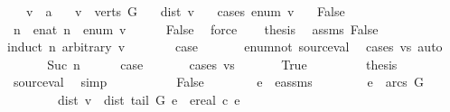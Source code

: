 \begin{isabellebody}
\ \ \ v\ {\isacharcolon}{\isacharcolon}\ {\isacharprime}a\isanewline
\ \ \ {\isachardoublequoteopen}v\ {\isasymin}\ verts\ G{\isachardoublequoteclose}\isanewline
\ \ \ {\isachardoublequoteopen}dist\ v\ {\isasymnoteq}\ {\isacharminus}{\isasyminfinity}{\isachardoublequoteclose}\isanewline
%
\isadelimproof
%
\endisadelimproof
%
\isatagproof
{}\isamarkupfalse%
\ {\isacharparenleft}cases\ {\isachardoublequoteopen}enum\ v\ {\isacharequal}\ {\isasyminfinity}{\isachardoublequoteclose}{\isacharparenright}\isanewline
{}\isamarkupfalse%
\ False\ \isanewline
\ \ \isamarkupfalse%
\ n\ \ {\isachardoublequoteopen}enat\ n\ {\isacharequal}\ enum\ v{\isachardoublequoteclose}\isanewline
\ \ \ \ \isamarkupfalse%
\ False\ \isamarkupfalse%
\ force\isanewline
\ \ \isamarkupfalse%
\ {\isacharquery}thesis\ \isamarkupfalse%
\ assms\ False\isanewline
\ \ \isamarkupfalse%
{\isacharparenleft}induct\ n\ arbitrary{\isacharcolon}\ v{\isacharparenright}\ \isanewline
\ \ \isamarkupfalse%
\ {}\ \isamarkupfalse%
\ {\isacharquery}case\ \isanewline
\ \ \ \ \isamarkupfalse%
\ enum{\isacharunderscore}not{}\ source{\isacharunderscore}val\ \isamarkupfalse%
\ {\isacharparenleft}cases\ {\isachardoublequoteopen}v{\isacharequal}s{\isachardoublequoteclose}{\isacharcomma}\ auto{\isacharparenright}\ \isanewline
\ \ \isamarkupfalse%
\isanewline
\ \ \isamarkupfalse%
\ {\isacharparenleft}Suc\ n{\isacharparenright}\isanewline
\ \ \ \ \isamarkupfalse%
\ {\isacharquery}case\ \isanewline
\ \ \ \ \isamarkupfalse%
\ {\isacharparenleft}cases\ {\isachardoublequoteopen}v{\isacharequal}s{\isachardoublequoteclose}{\isacharparenright}\ \isanewline
\ \ \ \ \isamarkupfalse%
\ True\ \isanewline
\ \ \ \ \ \ \isamarkupfalse%
\ {\isacharquery}thesis\ \isamarkupfalse%
\ source{\isacharunderscore}val\ \isamarkupfalse%
\ simp\isanewline
\ \ \ \ \isamarkupfalse%
\isanewline
\ \ \ \ \isamarkupfalse%
\ False\isanewline
\ \ \ \ \ \ \isamarkupfalse%
\ e\ \ e{\isacharunderscore}assms{\isacharcolon}\isanewline
\ \ \ \ \ \ \ \ {\isachardoublequoteopen}e\ {\isasymin}\ arcs\ G{\isachardoublequoteclose}\isanewline
\ \ \ \ \ \ \ \ {\isachardoublequoteopen}dist\ v\ {\isacharequal}\ dist\ {\isacharparenleft}tail\ G\ e{\isacharparenright}\ {\isacharplus}\ ereal\ {\isacharparenleft}c\ e{\isacharparenright}{\isachardoublequoteclose}\ \isanewline

\end{isabellebody}
